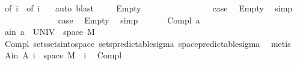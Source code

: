 \begin{isabellebody}
\ {\isacharasterisk}{\kern0pt}{\isacharparenleft}{\kern0pt}{}{\isacharparenright}{\kern0pt}{\isacharbrackleft}{\kern0pt}of\ i{\isacharbrackright}{\kern0pt}\ {\isacharasterisk}{\kern0pt}{\isacharparenleft}{\kern0pt}{}{\isacharparenright}{\kern0pt}\ {\isacharasterisk}{\kern0pt}{\isacharasterisk}{\kern0pt}{\isacharparenleft}{\kern0pt}{}{\isacharparenright}{\kern0pt}{\isacharbrackleft}{\kern0pt}of\ i{\isacharbrackright}{\kern0pt}\ {\isacharasterisk}{\kern0pt}{\isacharasterisk}{\kern0pt}{\isacharparenleft}{\kern0pt}{}{\isacharparenright}{\kern0pt}\ \isamarkupfalse%
\ auto\ blast{\isacharplus}{\kern0pt}\ \isanewline
{}\isamarkupfalse%
\isanewline
\ \ \isamarkupfalse%
\ Empty\isanewline
\ \ \isacommand{{\isacharbraceleft}{\kern0pt}}\isamarkupfalse%
\isanewline
\ \ \ \ \isamarkupfalse%
\ {}\isanewline
\ \ \ \ \isamarkupfalse%
\ \isamarkupfalse%
\ {\isacharquery}{\kern0pt}case\ \isamarkupfalse%
\ Empty\ \isamarkupfalse%
\ simp\isanewline
\ \ \isamarkupfalse%
\isanewline
\ \ \ \ \isamarkupfalse%
\ {}\isanewline
\ \ \ \ \isamarkupfalse%
\ \isamarkupfalse%
\ {\isacharquery}{\kern0pt}case\ \isamarkupfalse%
\ Empty\ \isamarkupfalse%
\ simp\isanewline
\ \ \isacommand{{\isacharbraceright}{\kern0pt}}\isamarkupfalse%
\isanewline
{}\isamarkupfalse%
\isanewline
\ \ \isamarkupfalse%
\ {\isacharparenleft}{\kern0pt}Compl\ a{\isacharparenright}{\kern0pt}\isanewline
\ \ \isamarkupfalse%
\ a{\isacharunderscore}{\kern0pt}in{\isacharcolon}{\kern0pt}\ {\isachardoublequoteopen}a\ {\isasymsubseteq}\ UNIV\ {\isasymtimes}\ space\ M{\isachardoublequoteclose}\ \isamarkupfalse%
\ Compl{\isacharparenleft}{\kern0pt}{}{\isacharparenright}{\kern0pt}\ sets{\isachardot}{\kern0pt}sets{\isacharunderscore}{\kern0pt}into{\isacharunderscore}{\kern0pt}space\ sets{\isacharunderscore}{\kern0pt}predictable{\isacharunderscore}{\kern0pt}sigma\ space{\isacharunderscore}{\kern0pt}predictable{\isacharunderscore}{\kern0pt}sigma\ \isamarkupfalse%
\ metis\isanewline
\ \ \isamarkupfalse%
\ A{\isacharunderscore}{\kern0pt}in{\isacharcolon}{\kern0pt}\ {\isachardoublequoteopen}A\ i\ {\isasymsubseteq}\ space\ M{\isachardoublequoteclose}\ \ i\ \isamarkupfalse%
\ Compl{\isacharparenleft}{\kern0pt}{}{\isacharparenright}{\kern0pt}\ \isamarkupfalse%

\end{isabellebody}

